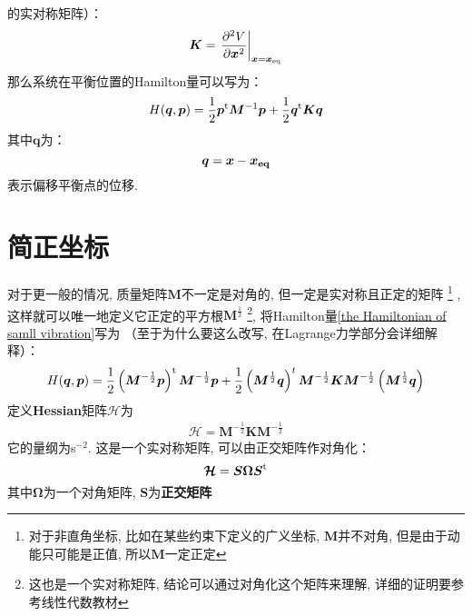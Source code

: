     的实对称矩阵）：
    \begin{equation}
        \bm{K} = \left.\frac{\partial{^2V}}{\partial{\bm{x}^2}}\right|_{\bm{x} = \bm{x}_{\mathrm{eq}}}
        \label{potential matrix}
    \end{equation}
    那么系统在平衡位置的Hamilton量可以写为：
    \begin{equation}
        H(\bm{q}, \bm{p}) = \frac{1}{2}\bm{p}^{\mathrm{t}}\bm{M}^{-1}\bm{p} + \frac{1}{2}\bm{q}^{\mathrm{t}}\bm{K}\bm{q}
        \label{the Hamiltonian of samll vibration}
    \end{equation}
    其中$\bm{q}$为：
    \begin{equation}
        \bm{q} = \bm{x} - \bm{x_{\mathrm{eq}}}
    \end{equation}
    表示偏移平衡点的位移.

    \section{简正坐标}
    对于更一般的情况, 质量矩阵$\bm{M}$不一定是对角的, 但一定是实对称且正定的矩阵
    \footnote{对于非直角坐标, 比如在某些约束下定义的广义坐标, $\bm{M}$并不对角, 
    但是由于动能只可能是正值, 所以$\bm{M}$一定正定}
    , 这样就可以唯一地定义它正定的平方根$\bm{M}^{\frac{1}{2}}$
    \footnote{这也是一个实对称矩阵, 结论可以通过对角化这个矩阵来理解, 
    详细的证明要参考线性代数教材}, 
    将Hamilton量\ref{the Hamiltonian of samll vibration}写为
    （至于为什么要这么改写, 在Lagrange力学部分会详细解释）：
    \begin{equation}
        H(\bm{q},\bm{p}) = \frac{1}{2}\left(\bm{M}^{-\frac{1}{2}}\bm{p}\right)^{\mathrm{t}}\bm{M}^{-\frac{1}{2}}\bm{p} + 
        \frac{1}{2}\left(\bm{M}^{\frac{1}{2}}\bm{q}\right)^{t}\bm{M}^{-\frac{1}{2}}\bm{K}\bm{M}^{-\frac{1}{2}}\left(\bm{M}^{\frac{1}{2}}\bm{q}\right)
    \end{equation}
    定义\textbf{Hessian}矩阵$\bm{\mathcal{H}}$为 
    \begin{equation}
        \begin{split}
            \bm{\mathcal{H}} = \bm{M}^{-\frac{1}{2}}\bm{K}\bm{M}^{-\frac{1}{2}}
        \end{split}
        \label{Hessian matrix}
    \end{equation}
    它的量纲为s$^{-2}$. 这是一个实对称矩阵, 可以由正交矩阵作对角化：
    \begin{equation}
        \bm{\mathcal{H}} = \bm{S}\bm{\bm{\Omega}S}^{\mathrm{t}}
    \end{equation}
    其中$\bm{\Omega}$为一个对角矩阵, $\bm{S}$为\textbf{正交矩阵}
